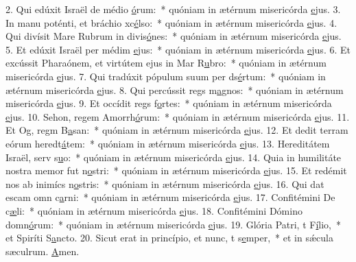 2. Qui edúxit Israël de médio \uline{ó}rum:~* quóniam in ætérnum misericórda \uline{e}jus.
3. In manu poténti, et bráchio xc\uline{é}lso:~* quóniam in ætérnum misericórda \uline{e}jus.
4. Qui divísit Mare Rubrum in divis\uline{ó}nes:~* quóniam in ætérnum misericórda \uline{e}jus.
5. Et edúxit Israël per médim \uline{e}jus:~* quóniam in ætérnum misericórda \uline{e}jus.
6. Et excússit Pharaónem, et virtútem ejus in Mar R\uline{u}bro:~* quóniam in ætérnum misericórda \uline{e}jus.
7. Qui tradúxit pópulum suum per ds\uline{é}rtum:~* quóniam in ætérnum misericórda \uline{e}jus.
8. Qui percússit regs m\uline{a}gnos:~* quóniam in ætérnum misericórda \uline{e}jus.
9. Et occídit regs f\uline{o}rtes:~* quóniam in ætérnum misericórda \uline{e}jus.
10. Sehon, regem Amorrh\uline{ó}rum:~* quóniam in ætérnum misericórda \uline{e}jus.
11. Et Og, regm B\uline{a}san:~* quóniam in ætérnum misericórda \uline{e}jus.
12. Et dedit terram eórum heredt\uline{á}tem:~* quóniam in ætérnum misericórda \uline{e}jus.
13. Hereditátem Israël, serv s\uline{u}o:~* quóniam in ætérnum misericórda \uline{e}jus.
14. Quia in humilitáte nostra memor fut n\uline{o}stri:~* quóniam in ætérnum misericórda \uline{e}jus.
15. Et redémit nos ab inimícs n\uline{o}stris:~* quóniam in ætérnum misericórda \uline{e}jus.
16. Qui dat escam omn c\uline{a}rni:~* quóniam in ætérnum misericórda \uline{e}jus.
17. Confitémini De c\uline{æ}li:~* quóniam in ætérnum misericórda \uline{e}jus.
18. Confitémini Dómino domn\uline{ó}rum:~* quóniam in ætérnum misericórda \uline{e}jus.
19. Glória Patri, t F\uline{í}lio,~* et Spiríti S\uline{a}ncto.
20. Sicut erat in princípio, et nunc, t s\uline{e}mper,~* et in sǽcula sæculrum. \uline{A}men.

